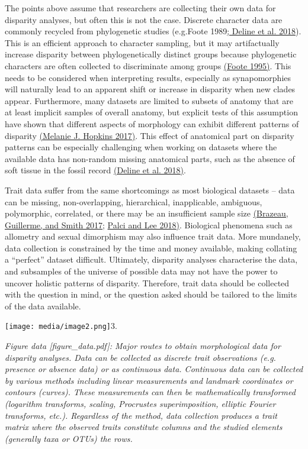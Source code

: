 The points above assume that researchers are collecting their own data
for disparity analyses, but often this is not the case. Discrete
character data are commonly recycled from phylogenetic studies
(e.g.Foote 1989\href{https://paperpile.com/c/sTGYvp/2Neu+0y4V}{; Deline
et al. 2018}). This is an efficient approach to character sampling, but
it may artifactually increase disparity between phylogenetically
distinct groups because phylogenetic characters are often collected to
discriminate among groups
\href{https://paperpile.com/c/sTGYvp/fTJ3}{(Foote 1995)}. This needs to
be considered when interpreting results, especially as synapomorphies
will naturally lead to an apparent shift or increase in disparity when
new clades appear. Furthermore, many datasets are limited to subsets of
anatomy that are at least implicit samples of overall anatomy, but
explicit tests of this assumption have shown that different aspects of
morphology can exhibit different patterns of disparity
\href{https://paperpile.com/c/sTGYvp/xLdm}{(Melanie J. Hopkins 2017)}.
This effect of anatomical part on disparity patterns can be especially
challenging when working on datasets where the available data has
non-random missing anatomical parts, such as the absence of soft tissue
in the fossil record \href{https://paperpile.com/c/sTGYvp/0y4V}{(Deline
et al. 2018)}.

Trait data suffer from the same shortcomings as most biological datasets
-- data can be missing, non-overlapping, hierarchical, inapplicable,
ambiguous, polymorphic, correlated, or there may be an insufficient
sample size \href{https://paperpile.com/c/sTGYvp/Yrbg}{(Brazeau,
Guillerme, and Smith 2017};
\href{https://paperpile.com/c/sTGYvp/yO2t}{Palci and Lee 2018)}.
Biological phenomena such as allometry and sexual dimorphism may also
influence trait data. More mundanely, data collection is constrained by
the time and money available, making collating a ``perfect'' dataset
difficult. Ultimately, disparity analyses characterise the data, and
subsamples of the universe of possible data may not have the power to
uncover holistic patterns of disparity. Therefore, trait data should be
collected with the question in mind, or the question asked should be
tailored to the limits of the data available.

\texttt{[image: media/image2.png]}3.

\emph{Figure data {[}figure\_data.pdf{]}: Major routes to obtain
morphological data for disparity analyses. Data can be collected as
discrete trait observations (e.g. presence or absence data) or as
continuous data. Continuous data can be collected by various methods
including linear measurements and landmark coordinates or contours
(curves). These measurements can then be mathematically transformed
(logarithm transforms, scaling, Procrustes superimposition, elliptic
Fourier transforms, etc.). Regardless of the method, data collection
produces a trait matrix where the observed traits constitute columns and
the studied elements (generally taxa or OTUs) the rows.}

